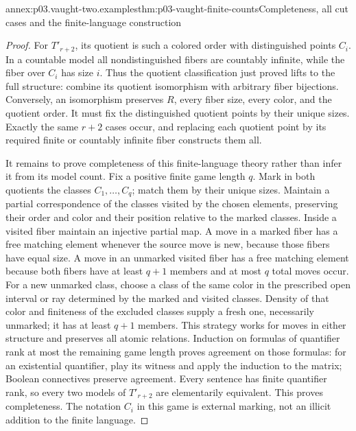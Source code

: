 \begin{annexitem}{annex:p03.vaught-two.examples}{thm:p03-vaught-finite-counts}{Completeness, all cut cases and the finite-language construction}
\begin{proof}
For \(T'_{r+2}\), its quotient is such a colored order with distinguished
points \(C_i\). In a countable model all nondistinguished fibers are
countably infinite, while the fiber over \(C_i\) has size \(i\).
Thus the quotient classification just proved lifts to the full structure:
combine its quotient isomorphism with arbitrary fiber bijections. Conversely,
an isomorphism preserves \(R\), every fiber size, every color, and the
quotient order. It must fix the distinguished quotient points by their
unique sizes. Exactly the same \(r+2\) cases occur, and replacing each
quotient point by its required finite or countably infinite fiber constructs
them all.

It remains to prove completeness of this finite-language theory rather than
infer it from its model count. Fix a positive finite game length \(q\).
Mark in both quotients the classes \(C_1,\ldots,C_q\); match them by
their unique sizes. Maintain a partial correspondence of the classes visited
by the chosen elements, preserving their order and color and their position
relative to the marked classes. Inside a visited fiber maintain an injective
partial map. A move in a marked fiber has a free matching element whenever
the source move is new, because those fibers have equal size. A move in an
unmarked visited fiber has a free matching element because both fibers have
at least \(q+1\) members and at most \(q\) total moves occur.
For a new unmarked class, choose a class of the same color in the prescribed
open interval or ray determined by the marked and visited classes.
Density of that color and finiteness of the excluded classes supply a fresh
one, necessarily unmarked; it has at least \(q+1\) members. This strategy
works for moves in either structure and preserves all atomic relations.
Induction on formulas of quantifier rank at most the remaining game length
proves agreement on those formulas: for an existential quantifier, play its
witness and apply the induction to the matrix; Boolean connectives preserve
agreement. Every sentence has finite quantifier rank, so every two models
of \(T'_{r+2}\) are elementarily equivalent. This proves completeness.
The notation \(C_i\) in this game is external marking, not an illicit
addition to the finite language.
\end{proof}
\end{annexitem}

